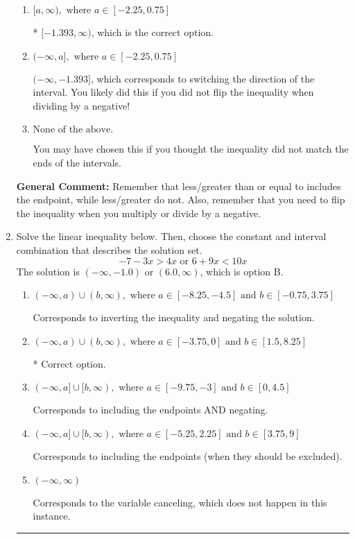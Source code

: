 \documentclass{extbook}[14pt]
\newcommand{\litem}[1]{\item #1

\rule{\textwidth}{0.4pt}}
\begin{document}
\begin{enumerate}
{\begin{enumerate}[label=\Alph*.]
 $[1.393, \infty)$, which corresponds to negating the endpoint of the solution.
\item \( [a, \infty), \text{ where } a \in [-2.25, 0.75] \)

* $[-1.393, \infty)$, which is the correct option.
\item \( (-\infty, a], \text{ where } a \in [-2.25, 0.75] \)

 $(-\infty, -1.393]$, which corresponds to switching the direction of the interval. You likely did this if you did not flip the inequality when dividing by a negative!
\item \( \text{None of the above}. \)

You may have chosen this if you thought the inequality did not match the ends of the intervals.
\end{enumerate}

\textbf{General Comment:} Remember that less/greater than or equal to includes the endpoint, while less/greater do not. Also, remember that you need to flip the inequality when you multiply or divide by a negative.
}
\litem{
Solve the linear inequality below. Then, choose the constant and interval combination that describes the solution set.
\[ -7 - 3 x > 4 x \text{ or } 6 + 9 x < 10 x \]The solution is \( (-\infty, -1.0) \text{ or } (6.0, \infty) \), which is option B.\begin{enumerate}[label=\Alph*.]
\item \( (-\infty, a) \cup (b, \infty), \text{ where } a \in [-8.25, -4.5] \text{ and } b \in [-0.75, 3.75] \)

Corresponds to inverting the inequality and negating the solution.
\item \( (-\infty, a) \cup (b, \infty), \text{ where } a \in [-3.75, 0] \text{ and } b \in [1.5, 8.25] \)

 * Correct option.
\item \( (-\infty, a] \cup [b, \infty), \text{ where } a \in [-9.75, -3] \text{ and } b \in [0, 4.5] \)

Corresponds to including the endpoints AND negating.
\item \( (-\infty, a] \cup [b, \infty), \text{ where } a \in [-5.25, 2.25] \text{ and } b \in [3.75, 9] \)

Corresponds to including the endpoints (when they should be excluded).
\item \( (-\infty, \infty) \)

Corresponds to the variable canceling, which does not happen in this instance.
\end{enumerate}

}
\end{enumerate}
\end{document}
